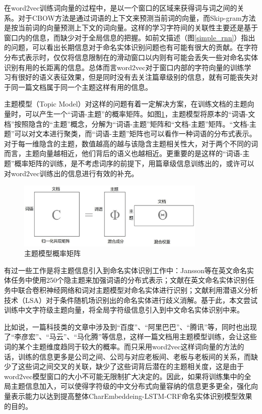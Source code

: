\documentclass[winfonts,master,oneside,nobackinfo]{njuthesis}
\begin{document}
在word2vec训练词向量的过程中，是以一个窗口的区域来获得词与词之间的关系。对于CBOW方法是通过词语的上下文来预测当前词的向量，而Skip-gram方法是按当前词的向量预测上下文的词向量。这样的学习字符间的关联性主要还是基于窗口内的信息，而缺少对于全局信息的把握。如前文描述（图\ref{simple_rnn}）指出的问题，可以看出长期信息对于命名实体识别问题也有可能有很大的贡献。在字符分布式表示时，仅仅将信息限制在的滑动窗口以内则有可能会丢失一些对命名实体识别有用的长距离的信息。总体而言word2vec对于窗口内部的字符向量的训练学习有很好的语义表征效果，但是同时没有去关注篇章级别的信息，就有可能丧失对于同一篇文档属于同一个主题这样有用的信息。

主题模型（Topic Model）对这样的问题有着一定解决方案，在训练文档的主题向量时，可以产生一个“词语-主题”的概率矩阵。如图\ref{lda-vec}，主题模型将原本的“词语-文档”按照隐含的“主题”概念，分解为“词语-主题”矩阵和“文档-主题”矩阵。“文档-主题”可以对文本进行聚类，而“词语-主题”矩阵也可以看作一种词语的分布式表示。对于每一维隐含的主题，数值越高的越与该隐含主题相关性大，对于两个不同的词而言，主题向量越相近，他们背后的语义也越相近。更重要的是这样的“词语-主题”概率矩阵的训练，是不考虑词序的前提下，用篇章级信息训练出的，或许可以对word2vec训练出的信息进行有效的补充。

\begin{figure}[H]
\centering
\includegraphics[width=0.8\textwidth]{./figure/主题模型.jpg}
\caption{主题模型概率矩阵}
\label{lda-vec}
\end{figure}
有过一些工作是将主题信息引入到命名实体识别工作中：Jansson等\cite{Jansson}在英文命名实体任务中使用250个隐主题来加强词语的分布式表示；文献\cite{kang}在英文命名实体识别任务中联合卷积神经网络和词对主题模型对命名实体进行识别；文献\cite{gong}利用潜语义分析技术（LSA）对于条件随机场识别出的命名实体进行歧义消解。基于此，本文尝试训练中文字符级主题向量，将全局字符级信息引入到中文命名实体识别中来。

比如说，一篇科技类的文章中涉及到“百度”、“阿里巴巴”、“腾讯”等，同时也出现了“李彦宏”、“马云”、“马化腾”等信息，这样一篇文档用主题模型训练，会让这些词的某个主题维度趋同于较大的概率。而只采用word2vec这样词向量的方法的话，训练的信息更多是公司之间、公司与对应老板间、老板与老板间的关系，而缺少了这些词之间交叉的关联，缺少了这些词背后潜在的主题相关度，这是由于word2vec模型窗口的大小不可能无限制扩大决定的。因此，如果将训练集中的全局主题信息加入，可以使得字符级的中文分布式向量容纳的信息更多更全，强化向量表示能力以达到提高整体CharEmbeddeing-LSTM-CRF命名实体识别模型效果的目的。
\end{document}
